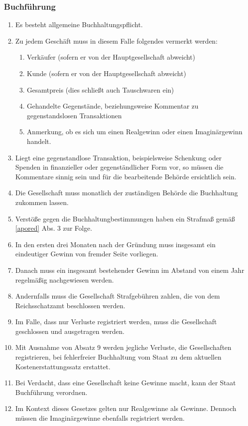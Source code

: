 \documentclass{article}
\begin{document}
\subsubsection{Buchführung} \label{buch}
\begin{enumerate}[(1)]
    \item Es besteht allgemeine Buchhaltungspflicht.
    \item Zu jedem Geschäft muss in diesem Falle folgendes vermerkt werden:
    \begin{enumerate}[1.]
        \item Verkäufer (sofern er von der Hauptgesellschaft abweicht)
        \item Kunde (sofern er von der Hauptgesellschaft abweicht)
        \item Gesamtpreis (dies schließt auch Tauschwaren ein)
        \item Gehandelte Gegenstände, beziehungsweise Kommentar zu gegenstandslosen Transaktionen
        \item Anmerkung, ob es sich um einen Realgewinn oder einen Imaginärgewinn handelt.
    \end{enumerate}
    \item Liegt eine gegenstandlose Transaktion, beispielsweise Schenkung oder Spenden in finanzieller oder gegenständlicher Form  vor, so müssen die Kommentare sinnig sein und für die bearbeitende Behörde ersichtlich sein.
    \item Die Gesellschaft muss monatlich der zuständigen Behörde die Buchhaltung zukommen lassen.
    \item Verstöße gegen die Buchhaltungbestimmungen haben ein Strafmaß gemäß \ref{apored} Abs. 3 zur Folge.
    \item In den ersten drei Monaten nach der Gründung muss insgesamt ein eindeutiger Gewinn von fremder Seite vorliegen.
    \item Danach muss ein insgesamt bestehender Gewinn im Abstand von einem Jahr regelmäßig nachgewiesen werden.
    \item Andernfalls muss die Gesellschaft Strafgebühren zahlen, die von dem Reichsschatzamt beschlossen werden.
    \item Im Falle, dass nur Verluste registriert werden, muss die Gesellschaft geschlossen und ausgetragen werden.
    \item Mit Ausnahme von Absatz 9 werden jegliche Verluste, die Gesellschaften registrieren, bei fehlerfreier Buchhaltung vom Staat zu dem aktuellen Kostenerstattungssatz erstattet.
    \item Bei Verdacht, dass eine Gesellschaft keine Gewinne macht, kann der Staat Buchführung verordnen.
    \item Im Kontext dieses Gesetzes gelten nur Realgewinne als Gewinne. Dennoch müssen die Imaginärgewinne ebenfalls registriert werden.
\end{enumerate}
\end{document}
